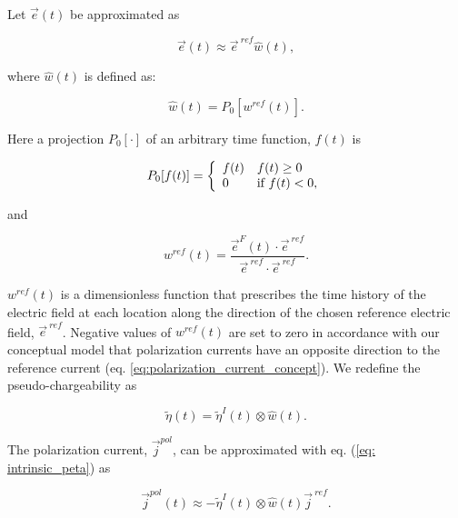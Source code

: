 \documentclass[extra,mreferee]{gji}
\renewcommand {\j}  { {\vec j} }
\newcommand {\e}  { {\vec e} }
\newcommand{\peta}{\tilde{\eta}}
\newcommand{\eref}{\e^{\ ref}}
\newcommand{\jref}{\j^{\ ref}}
\begin{document}

Let $\e(t)$ be approximated as
\begin{linenomath*}
\begin{equation}
  \e(t) \approx \eref \hat{w}(t),
  \label{eq: e_with_eref}
\end{equation}
\end{linenomath*}
where $\hat{w}(t)$ is defined as:
\begin{linenomath*}
\begin{equation}
  \hat{w}(t) = P_0[w^{ref}(t)].
  \label{eq: we}
\end{equation}
\end{linenomath*}
Here a projection $P_0[\cdot]$ of an arbitrary time function, $f(t)$ is
\begin{linenomath*}
\begin{equation}
  P_0[f(t)] = \left\{
  \begin{array}{l l}
    f(t) & f(t) \ge 0 \\
    0 & \text{if } f(t) < 0,
  \end{array}\right.
  \label{eq: P0}
\end{equation}
\end{linenomath*}
and
\begin{linenomath*}
\begin{equation}
  w^{ref}(t) = \frac{\e^F(t)\cdot\eref}{\eref\cdot\eref}.
  \label{eq: wref}
\end{equation}
\end{linenomath*}
$w^{ref}(t)$ is a dimensionless function that prescribes the time history of the electric field at each location along the direction of the chosen reference electric field, $\eref$.  Negative values of  $w^{ref}(t)$ are set to zero in accordance with our conceptual model that polarization currents have an opposite direction to the reference current (eq. \ref{eq:polarization_current_concept}).
We redefine the pseudo-chargeability as
\begin{linenomath*}
\begin{equation}
    \peta(t) = \peta^{I}(t)\otimes \hat{w}(t).
    \label{eq: pseudochargeability}
\end{equation}
\end{linenomath*}
The polarization current, $\j^{pol}$, can be approximated with eq. (\ref{eq: intrinsic_peta}) as
\begin{linenomath*}
\begin{equation}
  \j^{pol}(t) \approx - \peta^{I}(t)\otimes \hat{w}(t)\jref.
\end{equation}
\end{linenomath*}
\end{document}
